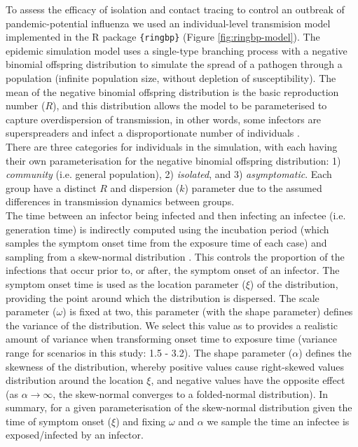 \documentclass{article}
\begin{document}
To assess the efficacy of isolation and contact tracing to control an outbreak of pandemic-potential influenza we used an individual-level transmision model implemented in the R package \texttt{\{ringbp\}} \citep{hellewellRingbpSimulateEvaluate2025} (Figure \ref{fig:ringbp-model}). The epidemic simulation model uses a single-type branching process with a negative binomial offspring distribution to simulate the spread of a pathogen through a population (infinite population size, without depletion of susceptibility). The mean of the negative binomial offspring distribution is the basic reproduction number ($R$), and this distribution allows the model to be parameterised to capture overdispersion of transmission, in other words, some infectors are superspreaders and infect a disproportionate number of individuals \citep{lloyd-smithSuperspreadingEffectIndividual2005, kucharskiEarlyDynamicsTransmission2020}. \\

There are three categories for individuals in the simulation, with each having their own parameterisation for the negative binomial offspring distribution: 1) \textit{community} (i.e. general population), 2) \textit{isolated}, and 3) \textit{asymptomatic}. Each group have a distinct $R$ and dispersion ($k$) parameter due to the assumed differences in transmission dynamics between groups. \\

The time between an infector being infected and then infecting an infectee (i.e. generation time) is indirectly computed using the incubation period (which samples the symptom onset time from the exposure time of each case) and sampling from a skew-normal distribution \citep{azzaliniClassDistributionsWhich1985}. This controls the proportion of the infections that occur prior to, or after, the symptom onset of an infector. The symptom onset time is used as the location parameter ($\xi$) of the distribution, providing the point around which the distribution is dispersed. The scale parameter ($\omega$) is fixed at two, this parameter (with the shape parameter) defines the variance of the distribution. We select this value as to provides a realistic amount of variance when transforming onset time to exposure time (variance range for scenarios in this study: 1.5 - 3.2). The shape parameter ($\alpha$) defines the skewness of the distribution, whereby positive values cause right-skewed values distribution around the location $\xi$, and negative values have the opposite effect (as $\alpha \rightarrow \infty$, the skew-normal converges to a folded-normal distribution). In summary, for a given parameterisation of the skew-normal distribution given the time of symptom onset ($\xi$) and fixing $\omega$ and $\alpha$ we sample the time an infectee is exposed/infected by an infector. \\
\end{document}
